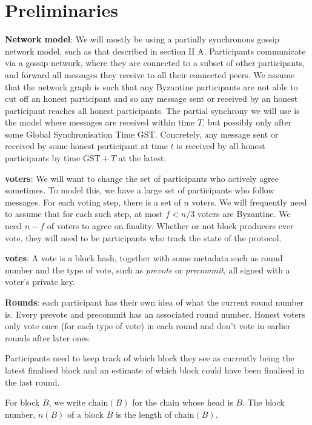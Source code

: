 \documentclass{article}
\def\GST{\mathrm{GST}}
\begin{document}
\section{Preliminaries} \label{sec:prelims}

{\bf Network model}: We will mostly be using a partially synchronous gossip network model, such as that described in \cite{Tendermint} section II A.
Participants communicate via a gossip network, where they are connected to a subset of other participants, and forward all messages they receive to all their connected peers.
We assume that the network graph is such that any Byzantine participants are not able to cut off an honest participant and so any message sent or received by an honest participant reaches all honest participants.
The partial synchrony we will use is the model where messages are received within time $T$, but possibly only after some Global Synchronisation Time $\GST$.
Concretely, any message sent or received by some honest participant at time $t$ is received by all honest participants by time $\GST+T$ at the latest.


{\bf voters}: We will want to change the set of participants who actively agree sometimes. To model this, we have a large set of participants who follow messages.
For each voting step, there is a set of $n$ voters.
We will frequently need to assume that for each such step, at most  $f < n/3$ voters are Byzantine.
We need $n-f$ of voters to agree on finality. Whether or not block producers ever vote, they will need to be participants who track the state of the protocol.

{\bf votes}: A vote is a block hash, together with some metadata such as round number and the type of vote, such as {\em prevote} or {\em precommit}, all signed with a voter's private key.

{\bf Rounds}: each participant has their own idea of what the current round number is. Every prevote and precommit has an associated round number. Honest voters only vote once (for each type of vote) in each round and don't vote in earlier rounds after later ones.

Participants need to keep track of which block they see as currently being the latest finalised block and an estimate of which block could have been finalised in the last round. 




For block $B$, we write $\mathrm{chain}(B)$ for the chain whose head is $B$. The block number, $n(B)$ of a block $B$ is the length of $\mathrm{chain}(B)$.
\end{document}
